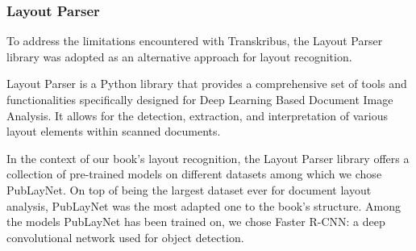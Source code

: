 \subsubsection{Layout Parser}
To address the limitations encountered with Transkribus, the Layout Parser library was adopted as an alternative approach for layout recognition.

Layout Parser \parencite{shen2021layoutparser} is a Python library that provides a comprehensive set of tools and functionalities specifically designed for Deep Learning Based Document Image Analysis. It allows for the detection, extraction, and interpretation of various layout elements within scanned documents.

In the context of our book's layout recognition, the Layout Parser library offers a collection of pre-trained models on different datasets among which we chose PubLayNet. On top of being the largest dataset ever for document layout analysis, PubLayNet was the most adapted one to the book's structure. 
Among the models PubLayNet has been trained on, we chose Faster R-CNN: a deep convolutional network used for object detection.\\[0.3cm]


